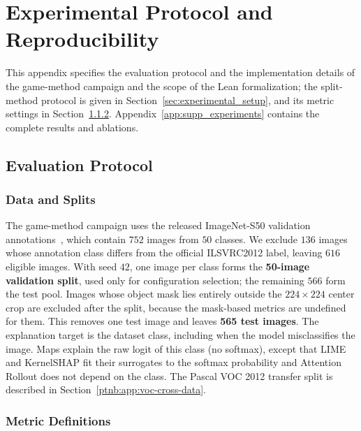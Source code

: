 \appendix
\chapter{Experimental Protocol and Reproducibility}\label{app:extended_results}

This appendix specifies the evaluation protocol and the implementation details of the game-method campaign and the scope of the Lean formalization; the split-method protocol is given in Section~\ref{sec:experimental_setup}, and its metric settings in Section~\ref{ptnb:app:metrics}. Appendix~\ref{app:supp_experiments} contains the complete results and ablations.

\section{Evaluation Protocol}\label{ptnb:app:protocol}

\subsection{Data and Splits}

The game-method campaign uses the released ImageNet-S50 validation annotations~\parencite{gao2022luss},
which contain $752$ images from $50$ classes. We exclude $136$ images whose annotation class
differs from the official ILSVRC2012 label, leaving $616$ eligible images. With seed $42$, one
image per class forms the \textbf{50-image validation split}, used only for configuration
selection; the remaining $566$ form the test pool. Images whose object mask lies entirely outside
the $224{\times}224$ center crop are excluded after the split, because the mask-based metrics are
undefined for them. This removes one test image and leaves \textbf{565 test images}. The
explanation target is the dataset class, including when the model misclassifies the image. Maps
explain the raw logit of this class (no softmax), except that LIME and KernelSHAP fit their surrogates
to the softmax probability and Attention Rollout does not depend on the class. The Pascal VOC 2012 transfer split is described in
Section~\ref{ptnb:app:voc-cross-data}.

\subsection{Metric Definitions}\label{ptnb:app:metrics}\label{app:metrics}

